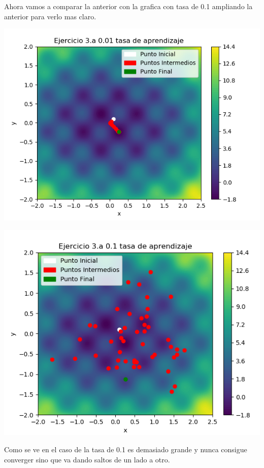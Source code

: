 \documentclass[titlepage]{article}
\begin{document}
	Ahora vamos a comparar la anterior con la grafica con tasa de 0.1 ampliando la anterior para verlo mas claro.
	
	\begin{center}
		\includegraphics[scale=0.5]{3_2.png}
	\end{center}

	\begin{center}
		\includegraphics[scale=0.5]{3_3.png}
	\end{center}
	
	Como se ve en el caso de la tasa de 0.1 es demasiado grande y nunca consigue converger sino que va dando saltos de un lado a otro.
	
\end{document}
